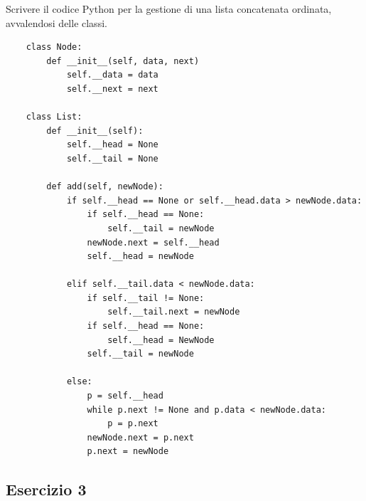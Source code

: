 \documentclass{article}
\numberwithin{equation}{section}
\begin{document}
Scrivere il codice Python per la gestione di una lista concatenata ordinata, avvalendosi delle classi. \\
\begin{verbatim}
    class Node:
        def __init__(self, data, next)
            self.__data = data
            self.__next = next

    class List:
        def __init__(self):
            self.__head = None
            self.__tail = None

        def add(self, newNode):            
            if self.__head == None or self.__head.data > newNode.data:
                if self.__head == None:
                    self.__tail = newNode
                newNode.next = self.__head
                self.__head = newNode

            elif self.__tail.data < newNode.data:
                if self.__tail != None:
                    self.__tail.next = newNode
                if self.__head == None:
                    self.__head = NewNode
                self.__tail = newNode

            else:            
                p = self.__head
                while p.next != None and p.data < newNode.data:
                    p = p.next
                newNode.next = p.next
                p.next = newNode
\end{verbatim}

\subsection*{Esercizio 3}
\end{document}

